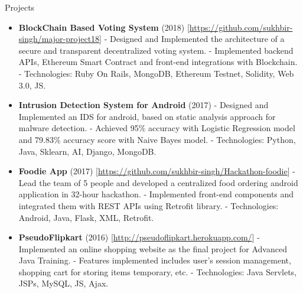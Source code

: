 \documentclass[]{mcdowellcv}
\begin{document}
	\begin{cvsection}{Projects}
		\begin{cvsubsection}{}{}{}
			\begin{itemize}
				\item \textbf{BlockChain Based Voting System} (2018) \textcolor[rgb]{.2,.2,.2}{[\href {https://github.com/sukhbir-singh/major-project18}{https://github.com/sukhbir-singh/major-project18}]}
				\newline- Designed and Implemented the architecture of a secure and transparent decentralized voting system.
				\newline- Implemented backend APIs, Ethereum Smart Contract and front-end integrations with Blockchain.
				\newline- Technologies: Ruby On Rails, MongoDB, Ethereum Testnet, Solidity, Web 3.0, JS.
				\newline
				\item \textbf{Intrusion Detection System for Android} (2017) 
				\newline- Designed and Implemented an IDS for android, based on static analysis approach for malware detection.
				\newline- Achieved 95\% accuracy with Logistic Regression model and 79.83\% accuracy score with Naive Bayes model.
				\newline- Technologies: Python, Java, Sklearn, AI, Django, MongoDB.
				\newline
				\item \textbf{Foodie App} (2017) \textcolor[rgb]{.2,.2,.2}{[\href {https://github.com/sukhbir-singh/Hackathon-foodie}{https://github.com/sukhbir-singh/Hackathon-foodie}]}
				\newline- Lead the team of 5 people and developed a centralized food ordering android application in 32-hour hackathon.
				\newline- Implemented front-end components and integrated them with REST APIs using Retrofit library.
				\newline- Technologies: Android, Java, Flask, XML, Retrofit.
				\newline
				\item \textbf{PseudoFlipkart} (2016) \textcolor[rgb]{.2,.2,.2}{[\href {http://pseudoflipkart.herokuapp.com/}{http://pseudoflipkart.herokuapp.com/}]}
				\newline- Implemented an online shopping website as the final project for Advanced Java Training.
				\newline- Features implemented includes user's session management, shopping cart for storing items temporary, etc.
				\newline- Technologies: Java Servlets, JSPs, MySQL, JS, Ajax.

			\end{itemize}
		\end{cvsubsection}
	\end{cvsection}
\end{document}
